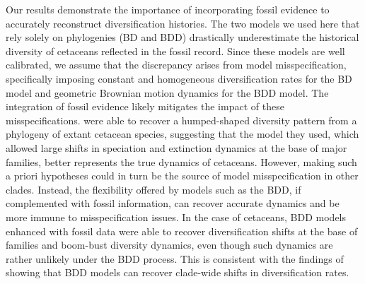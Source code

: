 \documentclass[oupdraft]{sysbio}
\begin{document}
Our results demonstrate the importance of incorporating fossil evidence to accurately reconstruct diversification histories. The two models we used here that rely solely on phylogenies (BD and BDD) drastically underestimate the historical diversity of cetaceans reflected in the fossil record. Since these models are well calibrated, we assume that the discrepancy arises from model misspecification, specifically imposing constant and homogeneous diversification rates for the BD model and geometric Brownian motion dynamics for the BDD model. The integration of fossil evidence likely mitigates the impact of these misspecifications. \citet{morlon_reconciling_2011, mazet_estimating_2023} were able to recover a humped-shaped diversity pattern from a phylogeny of extant cetacean species, suggesting that the model they used, which allowed large shifts in speciation and extinction dynamics at the base of major families, better represents the true dynamics of cetaceans. However, making such a priori hypotheses could in turn be the source of model misspecification in other clades. Instead, the flexibility offered by models such as the BDD, if complemented with fossil information, can recover accurate dynamics and be more immune to misspecification issues. In the case of cetaceans, BDD models enhanced with fossil data were able to recover diversification shifts at the base of families and boom-bust diversity dynamics, even though such dynamics are rather unlikely under the BDD process. This is consistent with the findings of \citet{quintero_imbalanced_2024} showing that BDD models can recover clade-wide shifts in diversification rates. 
\end{document}
